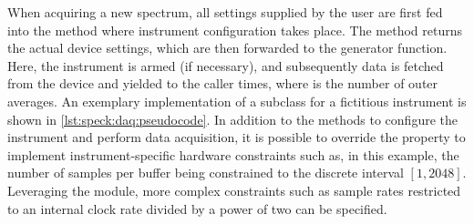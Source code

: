 When acquiring a new spectrum, all settings supplied by the user are first fed into the  method where instrument configuration takes place.
The method returns the actual device settings,
which are then forwarded to the  generator function.
Here, the instrument is armed (if necessary), and subsequently data is fetched from the device and yielded to the caller  times, where  is the number of outer averages.
An exemplary implementation of a  subclass for a fictitious instrument is shown in \cref{lst:speck:daq:pseudocode}.
In addition to the methods to configure the instrument and perform data acquisition, it is possible to override the  property to implement instrument-specific hardware constraints such as, in this example, the number of samples per buffer being constrained to the discrete interval $[1, 2048]$.
Leveraging the  module, more complex constraints such as sample rates restricted to an internal clock rate divided by a power of two
can be specified.

